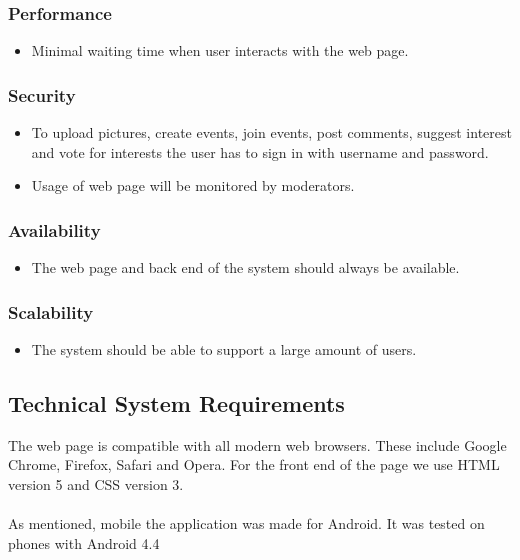 \subsubsection{Performance}
\begin{itemize}
    \item Minimal waiting time when user interacts with the web page.
\end{itemize}

\subsubsection{Security}
\begin{itemize}
    \item To upload pictures, create events, join events, post comments, suggest interest and vote for interests the user has to sign in with username and password.
    \item Usage of web page will be monitored by moderators.
\end{itemize}

\subsubsection{Availability}
\begin{itemize}
    \item The web page and back end of the system should always be available.
\end{itemize}

\subsubsection{Scalability}
\begin{itemize}
    \item The system should be able to support a large amount of users.
\end{itemize}

\subsection{Technical System Requirements}
\label{subsec:SysReqReqsTechnical}
The web page is compatible with all modern web browsers. These include Google Chrome, Firefox, Safari and Opera. For the front end of the page we use HTML version 5 and CSS version 3.

\paragraph{} As mentioned, mobile the application was made for Android. It was tested on phones with Android 4.4

